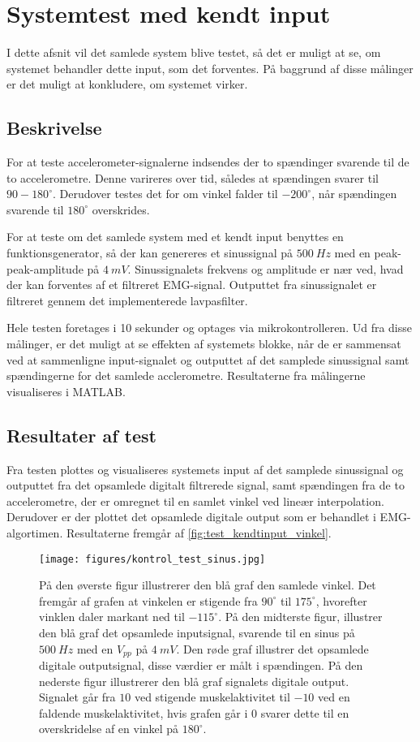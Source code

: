 \section{Systemtest med kendt input}
I dette afsnit vil det samlede system blive testet, så det er muligt at se, om systemet behandler dette input, som det forventes. På baggrund af disse målinger er det muligt at konkludere, om systemet virker. 

\subsection{Beskrivelse}
For at teste accelerometer-signalerne indsendes der to spændinger svarende til de to accelerometre. Denne varireres over tid, således at spændingen svarer til $90-180^{\circ}$. Derudover testes det for om vinkel falder til $-200^{\circ}$, når spændingen svarende til $180^{\circ}$ overskrides. 

For at teste om det samlede system med et kendt input benyttes en funktionsgenerator, så der kan genereres et sinussignal på $500~Hz$ med en peak-peak-amplitude på $4~mV$. Sinussignalets frekvens og amplitude er nær ved, hvad der kan forventes af et filtreret EMG-signal. Outputtet fra sinussignalet er filtreret gennem det implementerede lavpasfilter. 


Hele testen foretages i 10 sekunder og optages via mikrokontrolleren. Ud fra disse målinger, er det muligt at se effekten af systemets blokke, når de er sammensat ved at sammenligne input-signalet og outputtet af det samplede sinussignal samt spændingerne for det samlede acclerometre. Resultaterne fra målingerne visualiseres i MATLAB. 


\subsection{Resultater af test}
Fra testen plottes og visualiseres systemets input af det samplede sinussignal og outputtet fra det opsamlede digitalt filtrerede signal, samt spændingen fra de to accelerometre, der er omregnet til en samlet vinkel ved lineær interpolation. Derudover er der plottet det opsamlede digitale output som er behandlet i EMG-algortimen. Resultaterne fremgår af \autoref{fig:test_kendtinput_vinkel}. 

\begin{figure}[H]
\centering
\texttt{[image: figures/kontrol\_test\_sinus.jpg]}
\caption{På den øverste figur illustrerer den blå graf den samlede vinkel. Det fremgår af grafen at vinkelen er stigende fra $90^{\circ}$ til $175^{\circ}$, hvorefter vinklen daler markant ned til $-115^{\circ}$. 
På den midterste figur, illustrer den blå graf det opsamlede inputsignal, svarende til en sinus på $500~Hz$ med en $V_{pp}$ på $4~mV$. Den røde graf illustrer det opsamlede digitale outputsignal, disse værdier er målt i spændingen. 
På den nederste figur illustrerer den blå graf signalets digitale output. Signalet går fra $10$ ved stigende muskelaktivitet til $-10$ ved en faldende muskelaktivitet, hvis grafen går i $0$ svarer dette til en overskridelse af en vinkel på $180^{\circ}$.}
\label{fig:test_kendtinput}
\end{figure}

